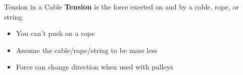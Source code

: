 \documentclass[12pt,compress,aspectratio=169]{beamer}
\begin{document}
%
%


\begin{frame}{Tension in a Cable}
  \textbf{Tension} is the force exerted on and by a cable, rope,
  or string.

  \begin{itemize}
  \item You can't push on a rope
  \item Assume the cable/rope/string to be mass less
  \item Force can change direction when used with pulleys
  \end{itemize}
\end{frame}
\end{document}
